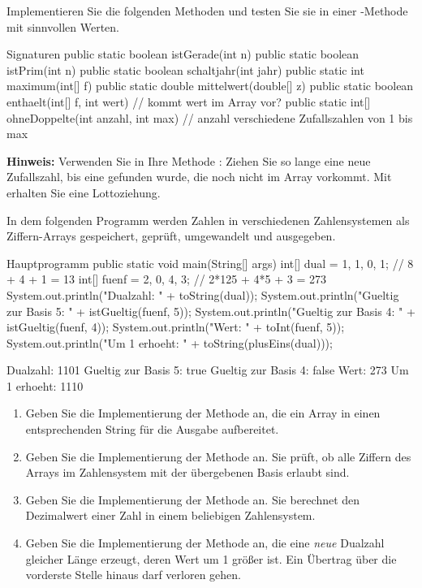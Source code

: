 Implementieren Sie die folgenden Methoden und testen Sie sie in einer -Methode mit sinnvollen Werten.
\begin{javacode}[Ausschnitt]{Signaturen}
public static boolean istGerade(int n)
public static boolean istPrim(int n)
public static boolean schaltjahr(int jahr)
public static int maximum(int[] f)
public static double mittelwert(double[] z)
public static boolean enthaelt(int[] f, int wert)         // kommt wert im Array vor?
public static int[] ohneDoppelte(int anzahl, int max)     // anzahl verschiedene Zufallszahlen von 1 bis max
\end{javacode}
\begin{hinweis}
\textbf{Hinweis:} Verwenden Sie in  Ihre Methode : Ziehen Sie so lange eine neue Zufallszahl, bis eine gefunden wurde, die noch nicht im Array vorkommt. Mit  erhalten Sie eine Lottoziehung.
\end{hinweis}

In dem folgenden Programm werden Zahlen in verschiedenen Zahlensystemen als Ziffern-Arrays gespeichert, geprüft, umgewandelt und ausgegeben.
\begin{javacode}[Ausschnitt]{Hauptprogramm}
public static void main(String[] args) {
	int[] dual = {1, 1, 0, 1};      // 8 + 4 + 1 = 13
	int[] fuenf = {2, 0, 4, 3};     // 2*125 + 4*5 + 3 = 273
	System.out.println("Dualzahl: " + toString(dual));
	System.out.println("Gueltig zur Basis 5: " + istGueltig(fuenf, 5));
	System.out.println("Gueltig zur Basis 4: " + istGueltig(fuenf, 4));
	System.out.println("Wert: " + toInt(fuenf, 5));
	System.out.println("Um 1 erhoeht: " + toString(plusEins(dual)));
}
\end{javacode}
\begin{konsole}
Dualzahl: 1101
Gueltig zur Basis 5: true
Gueltig zur Basis 4: false
Wert: 273
Um 1 erhoeht: 1110
\end{konsole}
\begin{enumerate}[label=\alph*)]
\item Geben Sie die Implementierung der Methode  an, die ein Array in einen entsprechenden String für die Ausgabe aufbereitet.
\item Geben Sie die Implementierung der Methode  an. Sie prüft, ob alle Ziffern des Arrays im Zahlensystem mit der übergebenen Basis erlaubt sind.
\item Geben Sie die Implementierung der Methode  an. Sie berechnet den Dezimalwert einer Zahl in einem beliebigen Zahlensystem.
\item Geben Sie die Implementierung der Methode  an, die eine \emph{neue} Dualzahl gleicher Länge erzeugt, deren Wert um 1 größer ist. Ein Übertrag über die vorderste Stelle hinaus darf verloren gehen.
\end{enumerate}

